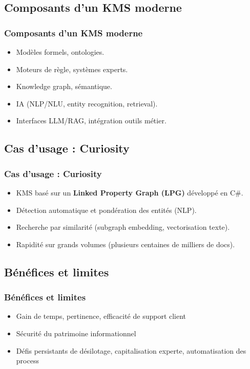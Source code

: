 \documentclass{beamer}
\begin{document}
\subsection{Composants d’un KMS moderne}
\begin{frame}
  \frametitle{Composants d’un KMS moderne}
  \begin{itemize}
    \item Modèles formels, ontologies.
    \item Moteurs de règle, systèmes experts.
    \item Knowledge graph, sémantique.
    \item IA (NLP/NLU, entity recognition, retrieval).
    \item Interfaces LLM/RAG, intégration outils métier.
  \end{itemize}
\end{frame}

\subsection{Cas d’usage : Curiosity}
\begin{frame}
  \frametitle{Cas d’usage : Curiosity}
  \begin{itemize}
    \item KMS basé sur un \textbf{Linked Property Graph (LPG)} développé en C\#.
    \item Détection automatique et pondération des entités (NLP).
    \item Recherche par similarité (subgraph embedding, vectorisation texte).
    \item Rapidité sur grands volumes (plusieurs centaines de milliers de docs).
  \end{itemize}
\end{frame}

\subsection{Bénéfices et limites}
\begin{frame}
  \frametitle{Bénéfices et limites}
  \begin{itemize}
    \item Gain de temps, pertinence, efficacité de support client
    \item Sécurité du patrimoine informationnel
    \item Défis persistants de désilotage, capitalisation experte, automatisation des process
  \end{itemize}
\end{frame}
\end{document}
